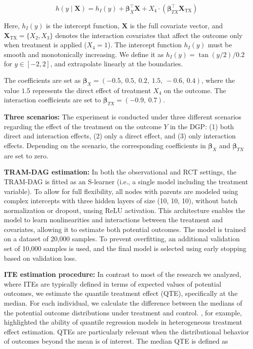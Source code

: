 \begin{equation}
h(y \mid \mathbf{X}) = h_I(y) + \boldsymbol{\beta}_X^\top \mathbf{X} + X_4 \cdot (\boldsymbol{\beta}_{TX}^\top \mathbf{X}_{\text{TX}})
\label{eq:outcome_dgp}
\end{equation}

Here, $h_I(y)$ is the intercept function, $\mathbf{X}$ is the full covariate vector, and $\mathbf{X}_{\text{TX}} = \{X_2, X_3\}$ denotes the interaction covariates that affect the outcome only when treatment is applied ($X_4 = 1$). The intercept function $h_I(y)$ must be smooth and monotonically increasing. We define it as $h_I(y) = \tan(y/2) / 0.2$ for $y \in [-2, 2]$, and extrapolate linearly at the boundaries.

The coefficients are set as $\boldsymbol{\beta}_X = (-0.5,\ 0.5,\ 0.2,\ 1.5,\ -0.6,\ 0.4)$, where the value $1.5$ represents the direct effect of treatment $X_4$ on the outcome. The interaction coefficients are set to $\boldsymbol{\beta}_{TX} = (-0.9,\ 0.7)$.

\medskip

\textbf{Three scenarios:} The experiment is conducted under three different scenarios regarding the effect of the treatment on the outcome $Y$ in the DGP: (1) both direct and interaction effects, (2) only a direct effect, and (3) only interaction effects. Depending on the scenario, the corresponding coefficients in $\boldsymbol{\beta}_X$ and $\boldsymbol{\beta}_{TX}$ are set to zero.

\medskip


\textbf{TRAM-DAG estimation:} In both the observational and RCT settings, the TRAM-DAG is fitted as an S-learner (i.e., a single model including the treatment variable). To allow for full flexibility, all nodes with parents are modeled using complex intercepts with three hidden layers of size (10, 10, 10), without batch normalization or dropout, unsing ReLU activation. This architecture enables the model to learn nonlinearities and interactions between the treatment and covariates, allowing it to estimate both potential outcomes. The model is trained on a dataset of 20,000 samples. To prevent overfitting, an additional validation set of 10,000 samples is used, and the final model is selected using early stopping based on validation loss.

\medskip

\textbf{ITE estimation procedure:} In contrast to most of the research we analyzed, where ITEs are typically defined in terms of expected values of potential outcomes, we estimate the quantile treatment effect (QTE), specifically at the median. For each individual, we calculate the difference between the medians of the potential outcome distributions under treatment and control. \citet{chernozhukov2005}, for example, highlighted the ability of quantile regression models in heterogeneous treatment effect estimation. QTEs are particularly relevant when the distributional behavior of outcomes beyond the mean is of interest. The median QTE is defined as

